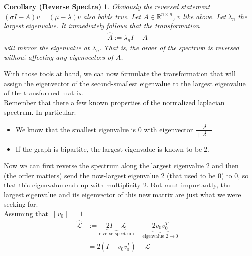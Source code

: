 \documentclass[10pt, a4paper, twocolumn]{article} %
\begin{document}
    \newtheorem{Reversal}[]{Corollary (Reverse Spectra)}[section]
    \begin{Reversal}
        Obviously the reversed statement $(\sigma I - A)v = (\mu - \lambda)v$ also holds true.
        Let $A \in \mathbb{R}^{n \times n}$, $v$ like above. Let $\lambda_n$ the largest eigenvalue.
        It immediately follows that the transformation
        \begin{align}
            \hat{A} := \lambda_n I - A
        \end{align}
        will mirror the eigenvalue at $\lambda_n$. That is, the order of the spectrum is reversed without affecting any eigenvectors of $A$.
    \end{Reversal}
    With those tools at hand, we can now formulate the transformation that will assign the eigenvector of the
    second-smallest eigenvalue to the largest eigenvalue of the transformed matrix.
    \\
    Remember that there a few known properties of the normalized laplacian spectrum. In particular:
    \begin{itemize}
        \item We know that the smallest eigenvalue is $0$ with eigenvector $\frac{D^\frac{1}{2}}{\lVert D^\frac{1}{2} \rVert}$ %
        \item If the graph is bipartite, the largest eigenvalue is known to be $2$.
    \end{itemize}

    Now we can first reverse the spectrum along the largest eigenvalue $2$ and then (the order matters) send the
    now-largest eigenvalue $2$ (that used to be $0$) to $0$, so that this eigenvalue ends up with multiplicity 2.
    But most importantly, the largest eigenvalue and its eigenvector of this new matrix are just what we were seeking for.
    \\
    Assuming that $\lVert v_0 \lVert = 1$
    \begin{equation}
        \label{shiftedlaplacian}
        \begin{split}
            \hat{\mathcal{L}} & := \underbrace{2I - \mathcal{L}}_{\text{reverse spectrum}} - \underbrace{2 v_0 v_0^T}_{\text{eigenvalue $2 \rightarrow 0$}}\\
            & = 2 ( I - v_0 v_0^T ) - \mathcal{L}
        \end{split}
    \end{equation}
\end{document}
